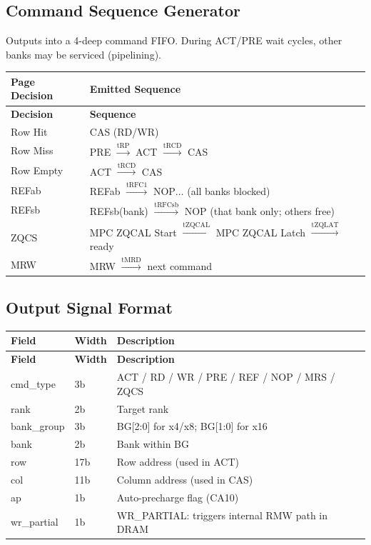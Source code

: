 \documentclass[11pt,a4paper]{article}
\begin{document}
\subsection{Command Sequence Generator}

Outputs into a 4-deep command FIFO. During ACT/PRE wait cycles, other banks
may be serviced (pipelining).

\begin{longtable}{L{3cm} L{11.5cm}}
\toprule
\textbf{Page Decision} & \textbf{Emitted Sequence} \\
\midrule
\endfirsthead\toprule\textbf{Decision}&\textbf{Sequence}\\\midrule\endhead
\bottomrule\endfoot
{}
Row Hit     & CAS (RD/WR) \\
Row Miss    & PRE $\xrightarrow{\text{tRP}}$ ACT $\xrightarrow{\text{tRCD}}$ CAS \\
Row Empty   & ACT $\xrightarrow{\text{tRCD}}$ CAS \\
REFab       & REFab $\xrightarrow{\text{tRFC1}}$ NOP$\ldots$ (all banks blocked) \\
REFsb       & REFsb(bank) $\xrightarrow{\text{tRFCsb}}$ NOP (that bank only; others free) \\
ZQCS        & MPC ZQCAL Start $\xrightarrow{\text{tZQCAL}}$ MPC ZQCAL Latch $\xrightarrow{\text{tZQLAT}}$ ready \\
MRW         & MRW $\xrightarrow{\text{tMRD}}$ next command \\
\end{longtable}

\subsection{Output Signal Format}

\begin{longtable}{L{3.5cm} C{2cm} L{9cm}}
\toprule
\textbf{Field} & \textbf{Width} & \textbf{Description} \\
\midrule
\endfirsthead\toprule\textbf{Field}&\textbf{Width}&\textbf{Description}\\\midrule\endhead
\bottomrule\endfoot
{}
cmd\_type   & 3b & ACT / RD / WR / PRE / REF / NOP / MRS / ZQCS \\
rank        & 2b & Target rank \\
bank\_group & 3b & BG[2:0] for x4/x8; BG[1:0] for x16 \\
bank        & 2b & Bank within BG \\
row         & 17b & Row address (used in ACT) \\
col         & 11b & Column address (used in CAS) \\
ap          & 1b & Auto-precharge flag (CA10) \\
wr\_partial & 1b & WR\_PARTIAL: triggers internal RMW path in DRAM \\
\end{longtable}
\end{document}

